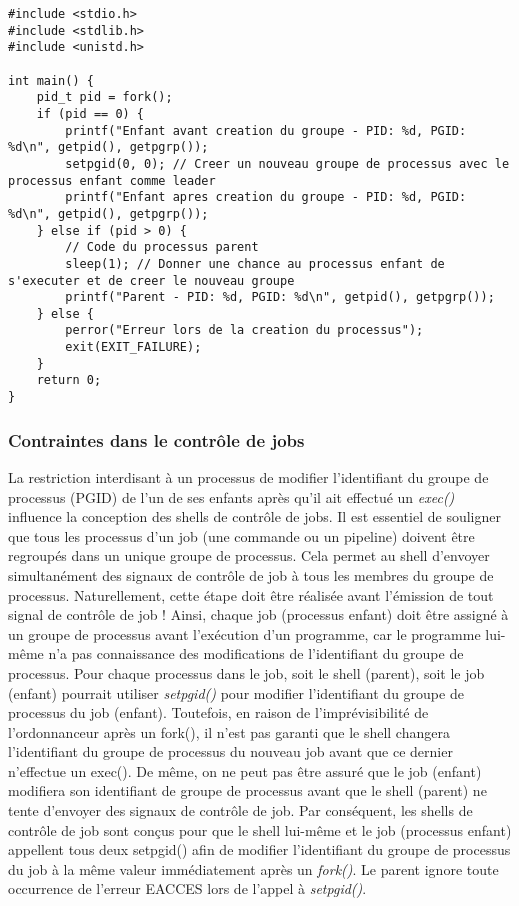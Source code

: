 \begin{lstlisting}[caption={creationGroupe.c}, label={creationGroupe.c}]
#include <stdio.h>
#include <stdlib.h>
#include <unistd.h>

int main() {
    pid_t pid = fork();
    if (pid == 0) {
        printf("Enfant avant creation du groupe - PID: %d, PGID: %d\n", getpid(), getpgrp());
        setpgid(0, 0); // Creer un nouveau groupe de processus avec le processus enfant comme leader
        printf("Enfant apres creation du groupe - PID: %d, PGID: %d\n", getpid(), getpgrp());
    } else if (pid > 0) {
        // Code du processus parent
        sleep(1); // Donner une chance au processus enfant de s'executer et de creer le nouveau groupe
        printf("Parent - PID: %d, PGID: %d\n", getpid(), getpgrp());
    } else {
        perror("Erreur lors de la creation du processus");
        exit(EXIT_FAILURE);
    }
    return 0;
}
\end{lstlisting}


\subsubsection{Contraintes dans le contrôle de jobs}

La restriction interdisant à un processus de modifier l'identifiant du groupe de processus (PGID) de l'un de ses enfants après qu'il ait effectué un \textit{exec()} influence la conception des shells de contrôle de jobs.
\newline
Il est essentiel de souligner que tous les processus d'un job (une commande ou un pipeline) doivent être regroupés dans un unique groupe de processus. Cela permet au shell d'envoyer simultanément des signaux de contrôle de job à tous les membres du groupe de processus. Naturellement, cette étape doit être réalisée avant l'émission de tout signal de contrôle de job !
\newline
Ainsi, chaque job (processus enfant) doit être assigné à un groupe de processus avant l'exécution d'un programme, car le programme lui-même n'a pas connaissance des modifications de l'identifiant du groupe de processus.
\newline
Pour chaque processus dans le job, soit le shell (parent), soit le job (enfant) pourrait utiliser \textit{setpgid()} pour modifier l'identifiant du groupe de processus du job (enfant). Toutefois, en raison de l'imprévisibilité de l'ordonnanceur après un fork(), il n'est pas garanti que le shell changera l'identifiant du groupe de processus du nouveau job avant que ce dernier n'effectue un exec(). De même, on ne peut pas être assuré que le job (enfant) modifiera son identifiant de groupe de processus avant que le shell (parent) ne tente d'envoyer des signaux de contrôle de job. Par conséquent, les shells de contrôle de job sont conçus pour que le shell lui-même et le job (processus enfant) appellent tous deux setpgid() afin de modifier l'identifiant du groupe de processus du job à la même valeur immédiatement après un \textit{fork()}. Le parent ignore toute occurrence de l'erreur EACCES lors de l'appel à \textit{setpgid()}.
\newline

